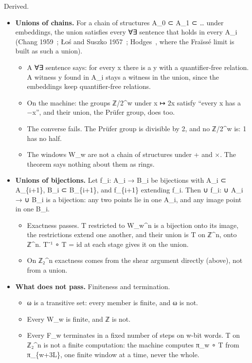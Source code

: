 Derived.

\begin{itemize}
\item \textbf{Unions of chains.} For a chain of structures A\_\allowbreak{}0 ⊂ A\_\allowbreak{}1 ⊂ … under embeddings, the union satisfies every ∀∃ sentence that holds in every A\_\allowbreak{}i (Chang 1959~\cite{src:Chang-1959}; Łoś and Suszko 1957~\cite{src:o-and-Suszko-1957}; Hodges~\cite{src:Hodges-1993}, where the Fraïssé limit is built as such a union).

\begin{itemize}
\item A ∀∃ sentence says: for every x there is a y with a quantifier-free relation. A witness y found in A\_\allowbreak{}i stays a witness in the union, since the embeddings keep quantifier-free relations.
\item On the machine: the groups ℤ/2\textasciicircum{}w under x ↦ 2x satisfy “every x has a −x”, and their union, the Prüfer group, does too.
\item The converse fails. The Prüfer group is divisible by 2, and no ℤ/2\textasciicircum{}w is: 1 has no half.
\item The windows W\_\allowbreak{}w are not a chain of structures under + and ×. The theorem says nothing about them as rings.
\end{itemize}
\item \textbf{Unions of bijections.} Let f\_\allowbreak{}i: A\_\allowbreak{}i → B\_\allowbreak{}i be bijections with A\_\allowbreak{}i ⊂ A\_\allowbreak{}\{i+1\}, B\_\allowbreak{}i ⊂ B\_\allowbreak{}\{i+1\}, and f\_\allowbreak{}\{i+1\} extending f\_\allowbreak{}i. Then ∪ f\_\allowbreak{}i: ∪ A\_\allowbreak{}i → ∪ B\_\allowbreak{}i is a bijection: any two points lie in one A\_\allowbreak{}i, and any image point in one B\_\allowbreak{}i.

\begin{itemize}
\item Exactness passes. T restricted to W\_\allowbreak{}w\textasciicircum{}n is a bijection onto its image, the restrictions extend one another, and their union is T on ℤ\textasciicircum{}n, onto ℤ\textasciicircum{}n. T⁻¹ ∘ T = id at each stage gives it on the union.
\item On ℤ₂\textasciicircum{}n exactness comes from the shear argument directly (above), not from a union.
\end{itemize}
\item \textbf{What does not pass.} Finiteness and termination.

\begin{itemize}
\item ω is a transitive set: every member is finite, and ω is not.
\item Every W\_\allowbreak{}w is finite, and ℤ is not.
\item Every F\_\allowbreak{}w terminates in a fixed number of steps on w-bit words. T on ℤ₂\textasciicircum{}n is not a finite computation: the machine computes π\_\allowbreak{}w ∘ T from π\_\allowbreak{}\{w+3L\}, one finite window at a time, never the whole.
\end{itemize}
\end{itemize}

